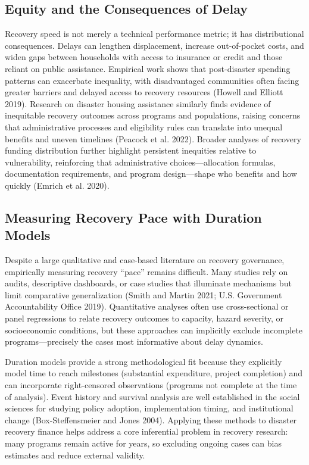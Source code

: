 \documentclass[
  12pt,
  letterpaper,
]{article}
\begin{document}
\subsection{Equity and the Consequences of
Delay}\label{equity-and-the-consequences-of-delay}

Recovery speed is not merely a technical performance metric; it has
distributional consequences. Delays can lengthen displacement, increase
out-of-pocket costs, and widen gaps between households with access to
insurance or credit and those reliant on public assistance. Empirical
work shows that post-disaster spending patterns can exacerbate
inequality, with disadvantaged communities often facing greater barriers
and delayed access to recovery resources (Howell and Elliott 2019).
Research on disaster housing assistance similarly finds evidence of
inequitable recovery outcomes across programs and populations, raising
concerns that administrative processes and eligibility rules can
translate into unequal benefits and uneven timelines (Peacock et al.
2022). Broader analyses of recovery funding distribution further
highlight persistent inequities relative to vulnerability, reinforcing
that administrative choices---allocation formulas, documentation
requirements, and program design---shape who benefits and how quickly
(Emrich et al. 2020).

\subsection{Measuring Recovery Pace with Duration
Models}\label{measuring-recovery-pace-with-duration-models}

Despite a large qualitative and case-based literature on recovery
governance, empirically measuring recovery ``pace'' remains difficult.
Many studies rely on audits, descriptive dashboards, or case studies
that illuminate mechanisms but limit comparative generalization (Smith
and Martin 2021; U.S. Government Accountability Office 2019).
Quantitative analyses often use cross-sectional or panel regressions to
relate recovery outcomes to capacity, hazard severity, or socioeconomic
conditions, but these approaches can implicitly exclude incomplete
programs---precisely the cases most informative about delay dynamics.

Duration models provide a strong methodological fit because they
explicitly model time to reach milestones (substantial expenditure,
project completion) and can incorporate right-censored observations
(programs not complete at the time of analysis). Event history and
survival analysis are well established in the social sciences for
studying policy adoption, implementation timing, and institutional
change (Box-Steffensmeier and Jones 2004). Applying these methods to
disaster recovery finance helps address a core inferential problem in
recovery research: many programs remain active for years, so excluding
ongoing cases can bias estimates and reduce external validity.
\end{document}
